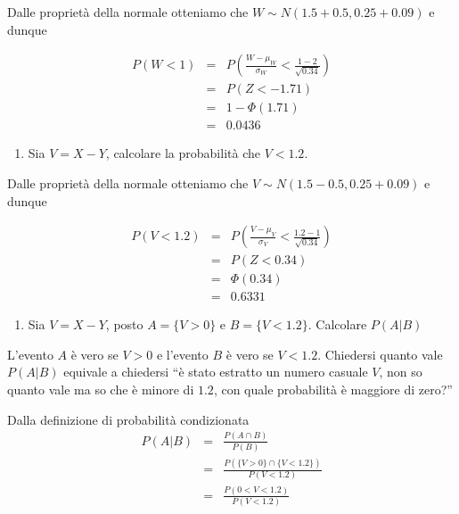 \documentclass[
  11pt,
]{book}
\providecommand{\tightlist}{%
  \setlength{\itemsep}{0pt}\setlength{\parskip}{0pt}}
\theoremstyle{mytheoremstyle}
\theoremstyle{mydefstyle}
\begin{document}
Dalle proprietà della normale otteniamo che \(W\sim N(1.5+0.5,0.25+0.09)\) e dunque

\begin{eqnarray*}
      P( W   <   1 ) 
        &=& P\left(  \frac { W  -  \mu_W }{ \sigma_W }  <  \frac { 1  -  2 }{\sqrt{ 0.34 }} \right)  \\
                 &=& P\left(  Z   <   -1.71 \right) \\    
                 &=&  1-\Phi( 1.71 ) \\ &=&  0.0436 
      \end{eqnarray*}

\begin{enumerate}
\def\labelenumi{\arabic{enumi}.}
\setcounter{enumi}{12}
\tightlist
\item
  Sia \(V=X-Y\), calcolare la probabilità che \(V<1.2\).
\end{enumerate}

Dalle proprietà della normale otteniamo che \(V\sim N(1.5-0.5,0.25+0.09)\) e dunque

\begin{eqnarray*}
      P( V   <   1.2 ) 
        &=& P\left(  \frac { V  -  \mu_V }{ \sigma_V }  <  \frac { 1.2  -  1 }{\sqrt{ 0.34 }} \right)  \\
                 &=& P\left(  Z   <   0.34 \right) \\    
                 &=&  \Phi( 0.34 ) \\ &=&  0.6331 
      \end{eqnarray*}

\begin{enumerate}
\def\labelenumi{\arabic{enumi}.}
\setcounter{enumi}{13}
\tightlist
\item
  Sia \(V=X-Y\), posto \(A=\{V>0\}\) e \(B=\{V<1.2\}\). Calcolare \(P(A|B)\)
\end{enumerate}

L'evento \(A\) è vero se \(V>0\) e l'evento \(B\) è vero se \(V<1.2\). Chiedersi quanto vale
\(P(A|B)\) equivale a chiedersi ``è stato estratto un numero casuale \(V\), non so quanto vale
ma so che è minore di \(1.2\), con quale probabilità è maggiore di zero?''

Dalla definizione di probabilità condizionata
\begin{eqnarray*}
   P(A|B)&=&\frac{P(A\cap B)}{P(B)}\\
   &=&\frac{P(\{V>0\}\cap \{V<1.2\})}{P(V<1.2)}\\
   &=&\frac{P(0<V<1.2)}{P(V<1.2)}
\end{eqnarray*}
\end{document}
